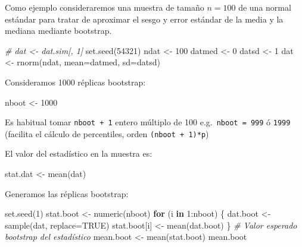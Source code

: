 \documentclass[
]{book}
\newenvironment{Shaded}{\begin{snugshade}}{\end{snugshade}}
\newcommand{\AttributeTok}[1]{\textcolor[rgb]{0.77,0.63,0.00}{#1}}
\newcommand{\CommentTok}[1]{\textcolor[rgb]{0.56,0.35,0.01}{\textit{#1}}}
\newcommand{\ConstantTok}[1]{\textcolor[rgb]{0.00,0.00,0.00}{#1}}
\newcommand{\ControlFlowTok}[1]{\textcolor[rgb]{0.13,0.29,0.53}{\textbf{#1}}}
\newcommand{\DecValTok}[1]{\textcolor[rgb]{0.00,0.00,0.81}{#1}}
\newcommand{\FunctionTok}[1]{\textcolor[rgb]{0.00,0.00,0.00}{#1}}
\newcommand{\NormalTok}[1]{#1}
\newcommand{\OtherTok}[1]{\textcolor[rgb]{0.56,0.35,0.01}{#1}}
\newcommand{\SpecialCharTok}[1]{\textcolor[rgb]{0.00,0.00,0.00}{#1}}
\theoremstyle{break}
\theoremstyle{definition}
\theoremstyle{definition}
\theoremstyle{definition}
\theoremstyle{definition}
\theoremstyle{remark}
\begin{document}
Como ejemplo consideraremos una muestra de tamaño \(n=100\) de una normal estándar para tratar de aproximar el sesgo y error estándar de la media y la mediana mediante bootstrap.

\begin{Shaded}
\begin{Highlighting}[]
\CommentTok{\# dat \textless{}{-} dat.sim[, 1]}
\FunctionTok{set.seed}\NormalTok{(}\DecValTok{54321}\NormalTok{)}
\NormalTok{ndat }\OtherTok{\textless{}{-}} \DecValTok{100}
\NormalTok{datmed }\OtherTok{\textless{}{-}} \DecValTok{0}
\NormalTok{datsd }\OtherTok{\textless{}{-}} \DecValTok{1}
\NormalTok{dat }\OtherTok{\textless{}{-}} \FunctionTok{rnorm}\NormalTok{(ndat, }\AttributeTok{mean=}\NormalTok{datmed, }\AttributeTok{sd=}\NormalTok{datsd)}
\end{Highlighting}
\end{Shaded}

Consideramos 1000 réplicas bootstrap:

\begin{Shaded}
\begin{Highlighting}[]
\NormalTok{nboot }\OtherTok{\textless{}{-}} \DecValTok{1000}  
\end{Highlighting}
\end{Shaded}

Es habitual tomar \texttt{nboot\ +\ 1} entero múltiplo de 100 e.g.~\texttt{nboot\ =\ 999} ó \texttt{1999}
(facilita el cálculo de percentiles, orden \texttt{(nboot\ +\ 1)*p})

El valor del estadístico en la muestra es:

\begin{Shaded}
\begin{Highlighting}[]
\NormalTok{stat.dat }\OtherTok{\textless{}{-}} \FunctionTok{mean}\NormalTok{(dat)}
\end{Highlighting}
\end{Shaded}

Generamos las réplicas bootstrap:

\begin{Shaded}
\begin{Highlighting}[]
\FunctionTok{set.seed}\NormalTok{(}\DecValTok{1}\NormalTok{)}
\NormalTok{stat.boot }\OtherTok{\textless{}{-}} \FunctionTok{numeric}\NormalTok{(nboot)}
\ControlFlowTok{for}\NormalTok{ (i }\ControlFlowTok{in} \DecValTok{1}\SpecialCharTok{:}\NormalTok{nboot) \{}
\NormalTok{  dat.boot }\OtherTok{\textless{}{-}} \FunctionTok{sample}\NormalTok{(dat, }\AttributeTok{replace=}\ConstantTok{TRUE}\NormalTok{)}
\NormalTok{  stat.boot[i] }\OtherTok{\textless{}{-}} \FunctionTok{mean}\NormalTok{(dat.boot)}
\NormalTok{\}}
\CommentTok{\# Valor esperado bootstrap del estadístico}
\NormalTok{mean.boot }\OtherTok{\textless{}{-}} \FunctionTok{mean}\NormalTok{(stat.boot)  }
\NormalTok{mean.boot}
\end{Highlighting}
\end{Shaded}
\end{document}
